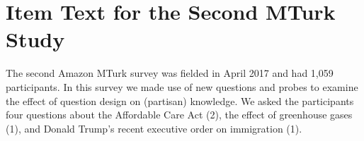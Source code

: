 \newpage




\clearpage
\section{Item Text for the Second MTurk Study}\label{si:mturk2}


The second Amazon MTurk survey was fielded in April 2017 and had 1,059 participants. In this survey we made use of new questions and probes to examine the effect of question design on (partisan) knowledge. We asked the participants four questions about the Affordable Care Act (2), the effect of greenhouse gases (1), and Donald Trump's recent executive order on immigration (1).

